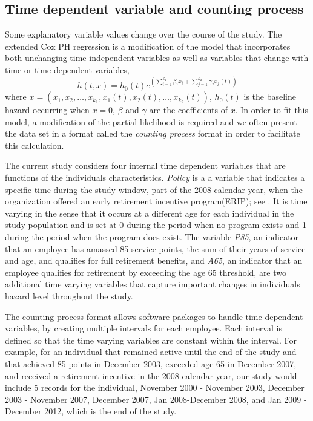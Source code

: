 \documentclass[12pt,letterpaper]{article}
\begin{document}
\subsection{Time dependent variable and counting process}
\label{sec:coxt}
Some explanatory variable values change over the course of the study. The extended Cox PH regression is a modification of the model that incorporates both unchanging time-independent variables as well as variables that change with time or time-dependent variables,
\begin{equation}
	\label{eq:timecovar}
	h(t,x)=h_0(t)e^{(\sum_{i=1}^{k_1}\beta_ix_i+\sum_{j=1}^{k_2}\gamma_jx_j(t))}
\end{equation}
where $x=(x_1, x_2, \ldots, x_{k_1}, x_1(t), x_2(t), \ldots, x_{k_2}(t))$, $h_0(t)$ is the baseline hazard occurring when $x=0$, $\beta$ and $\gamma$ are the coefficients of $x$. In order to fit this model, a modification of the partial likelihood is required and we often present the data set in a format called the {\it counting process} format in order to facilitate this calculation.

The current study considers four internal time dependent variables that are functions of the individuals characteristics. {\it Policy} is a a variable that indicates a specific time during the study window, part of the 2008 calendar year, when the organization offered an early retirement incentive program(ERIP); see \citep{ERIP}.
 It is time varying in the sense that it occurs at a different age for each individual in the study population and is set at 0 during the period when no program exists and 1 during the period when the program does exist. The variable {\it P85}, an indicator that an employee has amassed 85 service points, the sum of their years of service and age, and qualifies for full retirement benefits, and {\it A65}, an indicator that an employee qualifies for retirement by exceeding the age 65 threshold, are two additional time varying variables that capture important changes in individuals hazard level throughout the study.


The counting process format allows software packages to handle time dependent variables, by creating multiple intervals for each employee.  Each interval is defined so that the time varying variables are constant within the interval.
For example, for an individual that remained active until the end of the study and that achieved 85 points in December 2003, exceeded age 65 in December 2007, and received a retirement incentive in the 2008 calendar year, our study would include 5 records for the individual, November 2000 - November 2003, December 2003 - November 2007, December 2007, Jan 2008-December 2008, and Jan 2009 - December 2012, which is the end of the study.
\end{document}
